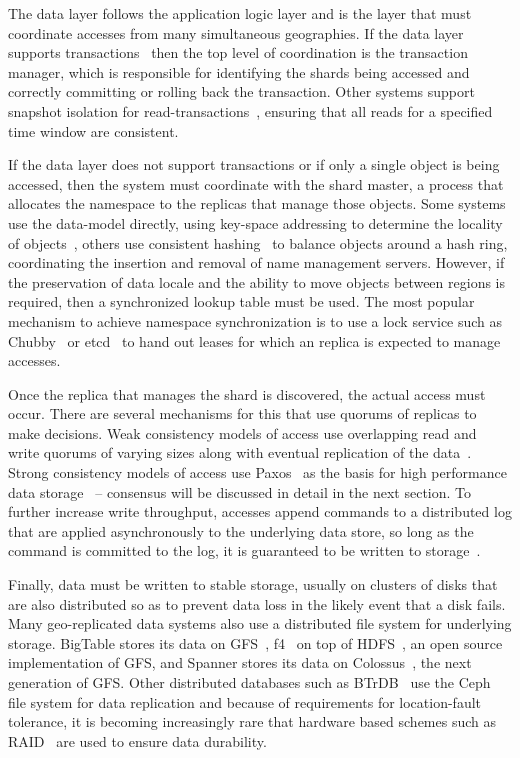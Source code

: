 The data layer follows the application logic layer and is the layer that must coordinate accesses from many simultaneous geographies.
If the data layer supports transactions~\cite{hat,calvindb,calvinfs,cockroachdb,vitess,aurora} then the top level of coordination is the transaction manager, which is responsible for identifying the shards being accessed and correctly committing or rolling back the transaction.
Other systems support snapshot isolation for read-transactions~\cite{spanner,megastore}, ensuring that all reads for a specified time window are consistent.

If the data layer does not support transactions or if only a single object is being accessed, then the system must coordinate with the shard master, a process that allocates the namespace to the replicas that manage those objects.
Some systems use the data-model directly, using key-space addressing to determine the locality of objects~\cite{bigtable,spanner}, others use consistent hashing~\cite{chord,scatter} to balance objects around a hash ring, coordinating the insertion and removal of name management servers.
However, if the preservation of data locale and the ability to move objects between regions is required, then a synchronized lookup table must be used.
The most popular mechanism to achieve namespace synchronization is to use a lock service such as Chubby~\cite{chubby} or etcd~\cite{etcd_raft} to hand out leases for which an replica is expected to manage accesses.

Once the replica that manages the shard is discovered, the actual access must occur.
There are several mechanisms for this that use quorums of replicas to make decisions.
Weak consistency models of access use overlapping read and write quorums of varying sizes along with eventual replication of the data~\cite{dynamo}.
Strong consistency models of access use Paxos~\cite{paxos} as the basis for high performance data storage~\cite{bolosky_paxos_2011,lampson_how_1996} -- consensus will be discussed in detail in the next section.
To further increase write throughput, accesses append commands to a distributed log that are applied asynchronously to the underlying data store, so long as the command is committed to the log, it is guaranteed to be written to storage~\cite{logbase,logfs,log_memory}.

Finally, data must be written to stable storage, usually on clusters of disks that are also distributed so as to prevent data loss in the likely event that a disk fails.
Many geo-replicated data systems also use a distributed file system for underlying storage.
BigTable stores its data on GFS~\cite{gfs}, f4~\cite{f4} on top of HDFS~\cite{hdfs}, an open source implementation of GFS, and Spanner stores its data on Colossus~\cite{colossus}, the next generation of GFS.
Other distributed databases such as BTrDB~\cite{btrdb} use the Ceph~\cite{ceph} file system for data replication and because of requirements for location-fault tolerance, it is becoming increasingly rare that hardware based schemes such as RAID~\cite{raid} are used to ensure data durability.

